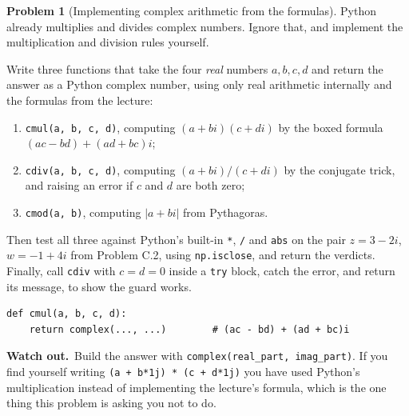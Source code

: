\documentclass[11pt]{article}
\theoremstyle{definition}
\newtheorem{prob}{Problem}[section]
\newcommand{\heads}[1]{\par\smallskip\noindent
  {\small\sffamily\textcolor{BrickRed}{\textbf{Watch out.}}\ #1}\par\smallskip}
\begin{document}
\begin{prob}[Implementing complex arithmetic from the formulas]
Python already multiplies and divides complex numbers. Ignore that, and
implement the multiplication and division rules yourself.

Write three functions that take the four \emph{real} numbers $a,b,c,d$ and
return the answer as a Python complex number, using only real arithmetic
internally and the formulas from the lecture:

\begin{enumerate}[label=\textbf{(\alph*)},leftmargin=2.6em,itemsep=7pt,topsep=6pt]
  \item \texttt{cmul(a, b, c, d)}, computing $(a+bi)(c+di)$ by the boxed formula
        $(ac-bd)+(ad+bc)i$;
  \item \texttt{cdiv(a, b, c, d)}, computing $(a+bi)/(c+di)$ by the conjugate
        trick, and raising an error if $c$ and $d$ are both zero;
  \item \texttt{cmod(a, b)}, computing $\lvert a+bi\rvert$ from Pythagoras.
\end{enumerate}

\noindent Then test all three against Python's built-in \texttt{*}, \texttt{/}
and \texttt{abs} on the pair $z=3-2i$, $w=-1+4i$ from Problem C.2, using
\texttt{np.isclose}, and return the verdicts. Finally, call \texttt{cdiv} with
$c=d=0$ inside a \texttt{try} block, catch the error, and return its message, to
show the guard works.

\begin{lstlisting}
def cmul(a, b, c, d):
    return complex(..., ...)        # (ac - bd) + (ad + bc)i
\end{lstlisting}

\heads{Build the answer with \texttt{complex(real\_part, imag\_part)}. If you
find yourself writing \texttt{(a + b*1j) * (c + d*1j)} you have used Python's
multiplication instead of implementing the lecture's formula, which is the one
thing this problem is asking you not to do.}
\end{prob}
\end{document}
